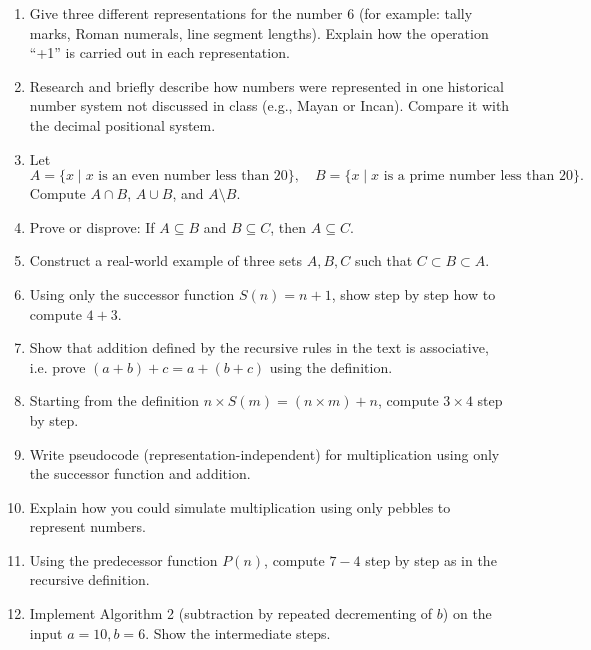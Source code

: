 \begin{enumerate}

  \item Give three different representations for the number 6 (for example: tally marks, Roman numerals, line segment lengths). Explain how the operation ``+1'' is carried out in each representation.  

  \item Research and briefly describe how numbers were represented in one historical number system not discussed in class (e.g., Mayan or Incan). Compare it with the decimal positional system.

  \item Let 
  \[
    A = \{x \mid x \text{ is an even number less than 20}\}, \quad 
    B = \{x \mid x \text{ is a prime number less than 20}\}.
  \]
  Compute $A \cap B$, $A \cup B$, and $A \setminus B$.

  \item Prove or disprove: If $A \subseteq B$ and $B \subseteq C$, then $A \subseteq C$.

  \item Construct a real-world example of three sets $A, B, C$ such that $C \subset B \subset A$.

  \item Using only the successor function $S(n) = n+1$, show step by step how to compute $4 + 3$.

  \item Show that addition defined by the recursive rules in the text is associative, i.e. prove $(a+b)+c = a+(b+c)$ using the definition.

  \item Starting from the definition $n \times S(m) = (n \times m) + n$, compute $3 \times 4$ step by step.

  \item Write pseudocode (representation-independent) for multiplication using only the successor function and addition.

  \item Explain how you could simulate multiplication using only pebbles to represent numbers.

  \item Using the predecessor function $P(n)$, compute $7 - 4$ step by step as in the recursive definition.

  \item Implement Algorithm 2 (subtraction by repeated decrementing of $b$) on the input $a = 10, b = 6$. Show the intermediate steps.


\end{enumerate}
